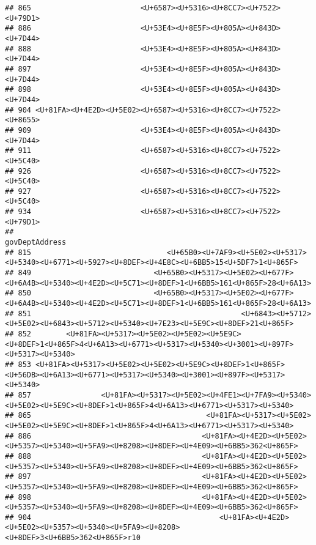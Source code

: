 \documentclass[
]{article}
\begin{document}
\begin{verbatim}
## 865                         <U+6587><U+5316><U+8CC7><U+7522><U+79D1>
## 886                         <U+53E4><U+8E5F><U+805A><U+843D><U+7D44>
## 888                         <U+53E4><U+8E5F><U+805A><U+843D><U+7D44>
## 897                         <U+53E4><U+8E5F><U+805A><U+843D><U+7D44>
## 898                         <U+53E4><U+8E5F><U+805A><U+843D><U+7D44>
## 904 <U+81FA><U+4E2D><U+5E02><U+6587><U+5316><U+8CC7><U+7522><U+8655>
## 909                         <U+53E4><U+8E5F><U+805A><U+843D><U+7D44>
## 911                         <U+6587><U+5316><U+8CC7><U+7522><U+5C40>
## 926                         <U+6587><U+5316><U+8CC7><U+7522><U+5C40>
## 927                         <U+6587><U+5316><U+8CC7><U+7522><U+5C40>
## 934                         <U+6587><U+5316><U+8CC7><U+7522><U+79D1>
##                                                                                                                        govDeptAddress
## 815                               <U+65B0><U+7AF9><U+5E02><U+5317><U+5340><U+6771><U+5927><U+8DEF><U+4E8C><U+6BB5>15<U+5DF7>1<U+865F>
## 849                            <U+65B0><U+5317><U+5E02><U+677F><U+6A4B><U+5340><U+4E2D><U+5C71><U+8DEF>1<U+6BB5>161<U+865F>28<U+6A13>
## 850                            <U+65B0><U+5317><U+5E02><U+677F><U+6A4B><U+5340><U+4E2D><U+5C71><U+8DEF>1<U+6BB5>161<U+865F>28<U+6A13>
## 851                                                <U+6843><U+5712><U+5E02><U+6843><U+5712><U+5340><U+7E23><U+5E9C><U+8DEF>21<U+865F>
## 852        <U+81FA><U+5317><U+5E02><U+5E02><U+5E9C><U+8DEF>1<U+865F>4<U+6A13><U+6771><U+5317><U+5340><U+3001><U+897F><U+5317><U+5340>
## 853 <U+81FA><U+5317><U+5E02><U+5E02><U+5E9C><U+8DEF>1<U+865F><U+56DB><U+6A13><U+6771><U+5317><U+5340><U+3001><U+897F><U+5317><U+5340>
## 857                <U+81FA><U+5317><U+5E02><U+4FE1><U+7FA9><U+5340><U+5E02><U+5E9C><U+8DEF>1<U+865F>4<U+6A13><U+6771><U+5317><U+5340>
## 865                                        <U+81FA><U+5317><U+5E02><U+5E02><U+5E9C><U+8DEF>1<U+865F>4<U+6A13><U+6771><U+5317><U+5340>
## 886                                       <U+81FA><U+4E2D><U+5E02><U+5357><U+5340><U+5FA9><U+8208><U+8DEF><U+4E09><U+6BB5>362<U+865F>
## 888                                       <U+81FA><U+4E2D><U+5E02><U+5357><U+5340><U+5FA9><U+8208><U+8DEF><U+4E09><U+6BB5>362<U+865F>
## 897                                       <U+81FA><U+4E2D><U+5E02><U+5357><U+5340><U+5FA9><U+8208><U+8DEF><U+4E09><U+6BB5>362<U+865F>
## 898                                       <U+81FA><U+4E2D><U+5E02><U+5357><U+5340><U+5FA9><U+8208><U+8DEF><U+4E09><U+6BB5>362<U+865F>
## 904                                           <U+81FA><U+4E2D><U+5E02><U+5357><U+5340><U+5FA9><U+8208><U+8DEF>3<U+6BB5>362<U+865F>r10

\end{verbatim}
\end{document}
